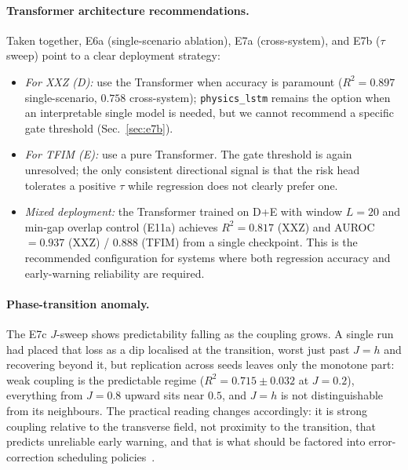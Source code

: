\documentclass[twocolumn,10pt]{article}
\begin{document}
\paragraph{Transformer architecture recommendations.}
Taken together, E6a (single-scenario ablation), E7a (cross-system),
and E7b ($\tau$ sweep) point to a clear deployment strategy:
\begin{itemize}
  \item \textit{For XXZ (D):} use the Transformer when accuracy is
    paramount ($R^2 = 0.897$ single-scenario, $0.758$ cross-system);
    \texttt{physics\_lstm} remains the option when an interpretable
    single model is needed, but we cannot recommend a specific gate
    threshold (Sec.~\ref{sec:e7b}).
  \item \textit{For TFIM (E):} use a pure Transformer.
    The gate threshold is again unresolved; the only consistent
    directional signal is that the risk head tolerates a positive
    $\tau$ while regression does not clearly prefer one.
  \item \textit{Mixed deployment:} the Transformer trained on D+E
    with window $L=20$ and min-gap overlap control (E11a) achieves
    $R^2 = 0.817$ (XXZ) and AUROC $= 0.937$ (XXZ) / $0.888$ (TFIM)
    from a single checkpoint.
    This is the recommended configuration for systems where both
    regression accuracy and early-warning reliability are required.
\end{itemize}

\paragraph{Phase-transition anomaly.}
The E7c $J$-sweep shows predictability falling as the coupling grows.
A single run had placed that loss as a dip localised at the transition,
worst just past $J = h$ and recovering beyond it, but replication across
seeds leaves only the monotone part: weak coupling is the predictable
regime ($R^2 = 0.715 \pm 0.032$ at $J = 0.2$), everything from
$J = 0.8$ upward sits near $0.5$, and $J = h$ is not distinguishable
from its neighbours.
The practical reading changes accordingly: it is strong coupling
relative to the transverse field, not proximity to the transition, that
predicts unreliable early warning, and that is what should be factored
into error-correction scheduling policies~\cite{Lidar2013}.
\end{document}
